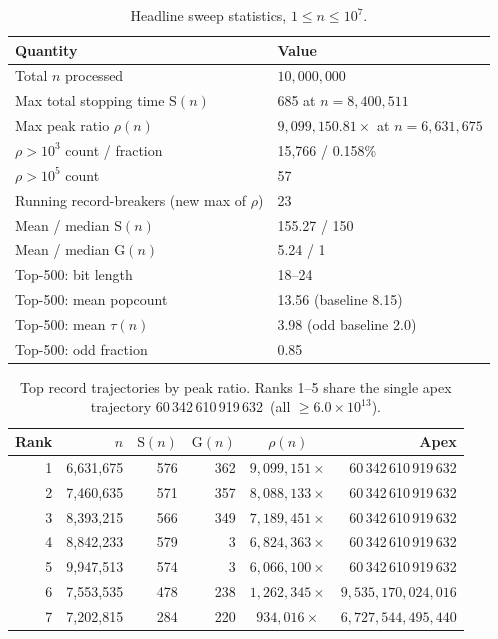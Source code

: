\documentclass[11pt]{article}
\theoremstyle{remark}
\newcommand{\rankOneApex}{60\,342\,610\,919\,632}
\begin{document}
\begin{table}[t]
\centering
\begin{tabular}{@{}ll@{}}
\toprule
Quantity & Value \\
\midrule
Total $n$ processed & $10{,}000{,}000$ \\
Max total stopping time $\mathrm{S}(n)$ & 685 at $n = 8{,}400{,}511$ \\
Max peak ratio $\rho(n)$ & $9{,}099{,}150.81\times$ at $n = 6{,}631{,}675$ \\
$\rho > 10^3$ count / fraction & 15{,}766 / 0.158\% \\
$\rho > 10^5$ count & 57 \\
Running record-breakers (new max of $\rho$) & 23 \\
Mean / median $\mathrm{S}(n)$ & 155.27 / 150 \\
Mean / median $\mathrm{G}(n)$ & 5.24 / 1 \\
Top-500: bit length & 18--24 \\
Top-500: mean popcount & 13.56 (baseline 8.15) \\
Top-500: mean $\tau(n)$ & 3.98 (odd baseline 2.0) \\
Top-500: odd fraction & 0.85 \\
\bottomrule
\end{tabular}
\caption{Headline sweep statistics, $1 \le n \le 10^7$.}
\label{tab:headline}
\end{table}

\begin{table}[t]
\centering
\small
\begin{tabular}{@{}rrrrcr@{}}
\toprule
Rank & $n$ & $\mathrm{S}(n)$ & $\mathrm{G}(n)$ & $\rho(n)$ & Apex \\
\midrule
1 & 6{,}631{,}675 & 576 & 362 & $9{,}099{,}151\times$ & \rankOneApex \\
2 & 7{,}460{,}635 & 571 & 357 & $8{,}088{,}133\times$ & \rankOneApex \\
3 & 8{,}393{,}215 & 566 & 349 & $7{,}189{,}451\times$ & \rankOneApex \\
4 & 8{,}842{,}233 & 579 & 3   & $6{,}824{,}363\times$ & \rankOneApex \\
5 & 9{,}947{,}513 & 574 & 3   & $6{,}066{,}100\times$ & \rankOneApex \\
6 & 7{,}553{,}535 & 478 & 238 & $1{,}262{,}345\times$ & $9{,}535{,}170{,}024{,}016$ \\
7 & 7{,}202{,}815 & 284 & 220 & $934{,}016\times$   & $6{,}727{,}544{,}495{,}440$ \\
\bottomrule
\end{tabular}
\caption{Top record trajectories by peak ratio. Ranks 1--5 share the single
apex trajectory \rankOneApex\ (all $\ge 6.0 \times 10^{13}$).}
\label{tab:top5}
\end{table}
\end{document}
